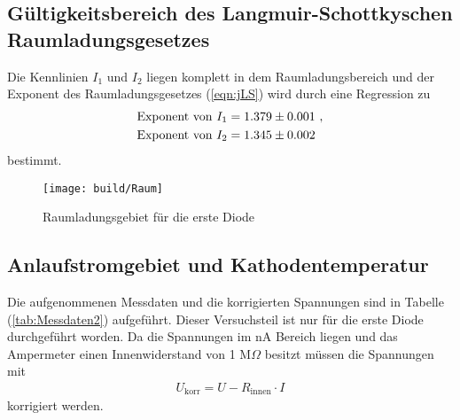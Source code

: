 \subsection{Gültigkeitsbereich des Langmuir-Schottkyschen Raumladungsgesetzes}
\label{sec:R}
Die Kennlinien $I_1$ und $I_2$ liegen komplett in dem Raumladungsbereich und der Exponent des Raumladungsgesetzes (\ref{eqn:jLS}) wird durch eine Regression zu
\begin{align*}
  \text{Exponent von}\ I_1 & =  \num{1.379 +- 0.001} \ , \\
  \text{Exponent von}\ I_2 & =  \num{1.345 +- 0.002}
\end{align*}
bestimmt.

\begin{figure}[H]
  \centering
  \texttt{[image: build/Raum]}
  \caption{Raumladungsgebiet für die erste Diode}
  \label{fig:}
\end{figure}

\subsection{Anlaufstromgebiet und Kathodentemperatur}
\label{sec:A}
Die aufgenommenen Messdaten und die korrigierten Spannungen sind in Tabelle (\ref{tab:Messdaten2}) aufgeführt. Dieser Versuchsteil ist nur für die erste Diode durchgeführt worden. Da die Spannungen im nA Bereich liegen und das Ampermeter einen Innenwiderstand von 1 M$\Omega$ besitzt müssen die Spannungen mit
\begin{align*}
  U_\text{korr} = U - R_\text{innen} \cdot I
\end{align*}
korrigiert werden.

